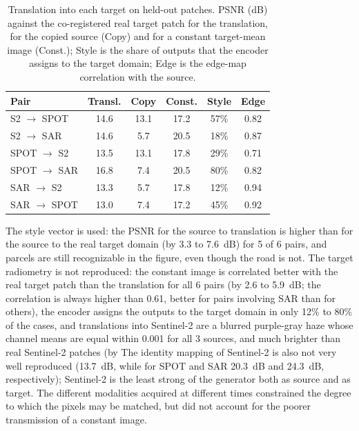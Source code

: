 \documentclass[conference]{IEEEtran}
\begin{document}
\begin{table}[t]
\centering
\caption{Translation into each target on held-out patches. PSNR (dB) against the co-registered real target patch for the translation, for the copied source (Copy) and for a constant target-mean image (Const.); Style is the share of outputs that the encoder assigns to the target domain; Edge is the edge-map correlation with the source.}
\label{tab:gen}
\footnotesize
\setlength{\tabcolsep}{3.5pt}
\begin{tabular}{@{}lccccc@{}}
\toprule
\textbf{Pair} & \textbf{Transl.} & \textbf{Copy} & \textbf{Const.} & \textbf{Style} & \textbf{Edge} \\
\midrule
S2 $\rightarrow$ SPOT   & 14.6 & 13.1 & 17.2 & 57\% & 0.82 \\
S2 $\rightarrow$ SAR    & 14.6 & 5.7 & 20.5 & 18\% & 0.87 \\
SPOT $\rightarrow$ S2   & 13.5 & 13.1 & 17.8 & 29\% & 0.71 \\
SPOT $\rightarrow$ SAR  & 16.8 & 7.4 & 20.5 & 80\% & 0.82 \\
SAR $\rightarrow$ S2    & 13.3 & 5.7 & 17.8 & 12\% & 0.94 \\
SAR $\rightarrow$ SPOT  & 13.0 & 7.4 & 17.2 & 45\% & 0.92 \\
\bottomrule
\end{tabular}
\end{table}

The style vector is used: the PSNR for the source to translation is higher than for the source to the real target domain (by 3.3 to 7.6~dB) for 5 of 6 pairs, and parcels are still recognizable in the figure, even though the road is not. The target radiometry is not reproduced: the constant image is correlated better with the real target patch than the translation for all 6 pairs (by 2.6 to 5.9~dB; the correlation is always higher than 0.61, better for pairs involving SAR than for others), the encoder assigns the outputs to the target domain in only 12\% to 80\% of the cases, and translations into Sentinel-2 are a blurred purple-gray haze whose channel means are equal within 0.001 for all 3 sources, and much brighter than real Sentinel-2 patches (by The identity mapping of Sentinel-2 is also not very well reproduced (13.7~dB, while for SPOT and SAR 20.3~dB and 24.3~dB, respectively); Sentinel-2 is the least strong of the generator both as source and as target. The different modalities acquired at different times constrained the degree to which the pixels may be matched, but did not account for the poorer transmission of a constant image.
\end{document}

